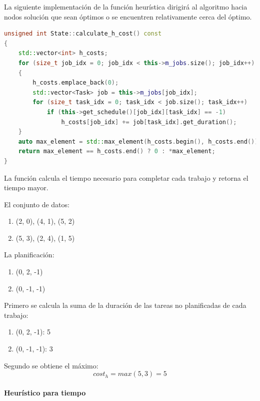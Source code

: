 La siguiente implementación de la función heurística
dirigirá al algoritmo hacia nodos solución que sean óptimos
o se encuentren relativamente cerca del óptimo.

\begin{lstlisting}[language=C++]
unsigned int State::calculate_h_cost() const
{
    std::vector<int> h_costs;
    for (size_t job_idx = 0; job_idx < this->m_jobs.size(); job_idx++)
    {
        h_costs.emplace_back(0);
        std::vector<Task> job = this->m_jobs[job_idx];
        for (size_t task_idx = 0; task_idx < job.size(); task_idx++)
            if (this->get_schedule()[job_idx][task_idx] == -1)
                h_costs[job_idx] += job[task_idx].get_duration();
    }
    auto max_element = std::max_element(h_costs.begin(), h_costs.end());
    return max_element == h_costs.end() ? 0 : *max_element;
}
\end{lstlisting}

La función calcula el tiempo necesario para completar cada trabajo
y retorna el tiempo mayor.

\begin{examplebox}
    El conjunto de datos:
    \begin{enumerate}[itemsep=0.25px]
        \item (2, 0), (4, 1), (5, 2)
        \item (5, 3), (2, 4), (1, 5)
    \end{enumerate}
    La planificación:
    \begin{enumerate}[itemsep=0.25px]
        \item (0, 2, -1)
        \item (0, -1, -1)
    \end{enumerate}

    Primero se calcula la suma de la duración de las tareas no planificadas de cada trabajo:

    \begin{enumerate}[itemsep=0.25px]
        \item (0, 2, -1): 5
        \item (0, -1, -1): 3
    \end{enumerate}

    Segundo se obtiene el máximo:
    $$cost_h = max(5, 3) = 5$$
\end{examplebox}

\pagebreak

\paragraph{Heurístico para tiempo}~

